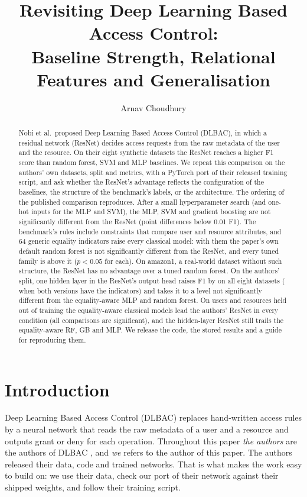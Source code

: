 \documentclass[11pt,a4paper]{article}
\title{Revisiting Deep Learning Based Access Control:\\ Baseline Strength, Relational Features and Generalisation}
\author{Arnav Choudhury}
\date{}
\newcommand{\margin}{0.01}
\begin{document}
\maketitle

\begin{abstract}
Nobi et al.\ proposed Deep Learning Based Access Control (DLBAC), in which a residual network (ResNet) decides access requests from the raw metadata of the user and the resource. On their eight synthetic datasets the ResNet reaches a higher F1 score than random forest, SVM and MLP baselines. We repeat this comparison on the authors' own datasets, split and metrics, with a PyTorch port of their released training script, and ask whether the ResNet's advantage reflects the configuration of the baselines, the structure of the benchmark's labels, or the architecture. The ordering of the published comparison reproduces. After a small hyperparameter search (and one-hot inputs for the MLP and SVM), the MLP, SVM and gradient boosting are not significantly different from the ResNet (point differences below \margin{} F1). The benchmark's rules include constraints that compare user and resource attributes, and 64 generic equality indicators raise every classical model: with them the paper's own default random forest is not significantly different from the ResNet, and every tuned family is above it ($p<0.05$ for each). On amazon1, a real-world dataset without such structure, the ResNet has no advantage over a tuned random forest. On the authors' split, one hidden layer in the ResNet's output head raises F1 by \vHeadVsResnetU{} on all eight datasets (\vHeadEqVsEqU{} when both versions have the indicators) and takes it to a level not significantly different from the equality-aware MLP and random forest. On users and resources held out of training the equality-aware classical models lead the authors' ResNet in every condition (all \coldAwareN{} comparisons are significant), and the hidden-layer ResNet still trails the equality-aware RF, GB and MLP. We release the code, the stored results and a guide for reproducing them.
\end{abstract}

\section{Introduction}

Deep Learning Based Access Control (DLBAC) \cite{nobi2022} replaces hand-written access rules by a neural network that reads the raw metadata of a user and a resource and outputs grant or deny for each operation. Throughout this paper \emph{the authors} are the authors of DLBAC \cite{nobi2022}, and \emph{we} refers to the author of this paper. The authors released their data, code and trained networks. That is what makes the work easy to build on: we use their data, check our port of their network against their shipped weights, and follow their training script.
\end{document}
